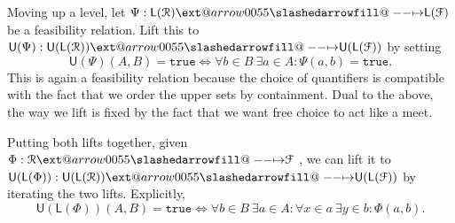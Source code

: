 \documentclass[12pt]{article}
\makeatletter
\theoremstyle{definition}
\theoremstyle{plain}
\theoremstyle{plain}
\theoremstyle{plain}
\theoremstyle{plain}
\theoremstyle{remark}
\theoremstyle{remark}
\newcommand{\mc}[1]{\mathcal{#1}}
\newcommand{\low}{\mathsf{L}}
\newcommand{\upper}{\mathsf{U}}
\newcommand{\true}{\mathtt{true}}
\newcommand{\false}{\mathtt{false}}
\def\slashedarrowfill@#1#2#3#4#5{%
	$\m@th\thickmuskip0mu\medmuskip\thickmuskip\thinmuskip\thickmuskip
	\relax#5#1\mkern-7mu%
	\cleaders\hbox{$#5\mkern-2mu#2\mkern-2mu$}\hfill
	\mathclap{#3}\mathclap{#2}%
	\cleaders\hbox{$#5\mkern-2mu#2\mkern-2mu$}\hfill
	\mkern-7mu#4$%
}
\def\rightslashedarrowfill@{%
	\slashedarrowfill@\relbar\relbar\mapstochar\rightarrow}
\newcommand\xslashedrightarrow[2][]{%
	\ext@arrow 0055{\rightslashedarrowfill@}{#1}{#2}}
\makeatother
\begin{document}
Moving up a level, let $\Psi: \low(\mc{R}) \xslashedrightarrow{} \low(\mc{F})$ be a feasibility relation. Lift this to $\upper(\Psi): \upper(\low(\mc{R})) \xslashedrightarrow{} \upper(\low(\mc{F}))$ by setting  
$$\upper(\Psi)(A,B) = \true \iff \forall b \in B \: \exists a \in A: \Psi(a,b)=\true.$$
This is again a feasibility relation because the choice of quantifiers is compatible with the fact that we order the upper sets by containment. Dual to the above, the way we lift is fixed by the fact that we want free choice to act like a meet.

Putting both lifts together, given $\Phi: \mc{R} \xslashedrightarrow{} \mc{F}$ , we can lift it to $\upper(\low(\Phi)): \upper(\low(\mc{R})) \xslashedrightarrow{} \upper(\low(\mc{F}))$ by iterating the two lifts. Explicitly,
$$ \upper(\low(\Phi))(A,B) = \true \iff \forall b \in B \: \exists a \in A: \forall x \in a \: \exists y \in b: \Phi(a,b).$$


\end{document}
